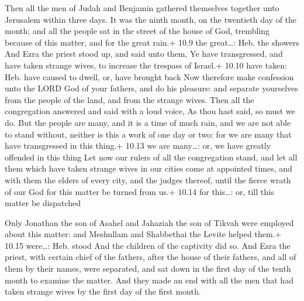  Then all the men of Judah and Benjamin gathered
themselves together unto Jerusalem within three days. It was the ninth
month, on the twentieth day of the month; and all the people sat in the
street of the house of God, trembling because of this matter, and for
the great rain.+ 10.9 the great\ldots: Heb. the showers 
And Ezra the priest stood up, and said unto them, Ye have transgressed,
and have taken strange wives, to increase the trespass of Israel.+ 10.10
have taken: Heb. have caused to dwell, or, have brought back
 Now therefore make confession unto the LORD God of your
fathers, and do his pleasure: and separate yourselves from the people of
the land, and from the strange wives.  Then all the
congregation answered and said with a loud voice, As thou hast said, so
must we do.  But the people are many, and it is a time of
much rain, and we are not able to stand without, neither is this a work
of one day or two: for we are many that have transgressed in this
thing.+ 10.13 we are many\ldots: or, we have greatly offended in this
thing  Let now our rulers of all the congregation stand,
and let all them which have taken strange wives in our cities come at
appointed times, and with them the elders of every city, and the judges
thereof, until the fierce wrath of our God for this matter be turned
from us.+ 10.14 for this\ldots: or, till this matter be dispatched

 Only Jonathan the son of Asahel and Jahaziah the son of
Tikvah were employed about this matter: and Meshullam and Shabbethai the
Levite helped them.+ 10.15 were\ldots: Heb. stood  And the
children of the captivity did so. And Ezra the priest, with certain
chief of the fathers, after the house of their fathers, and all of them
by their names, were separated, and sat down in the first day of the
tenth month to examine the matter.  And they made an end
with all the men that had taken strange wives by the first day of the
first month.

